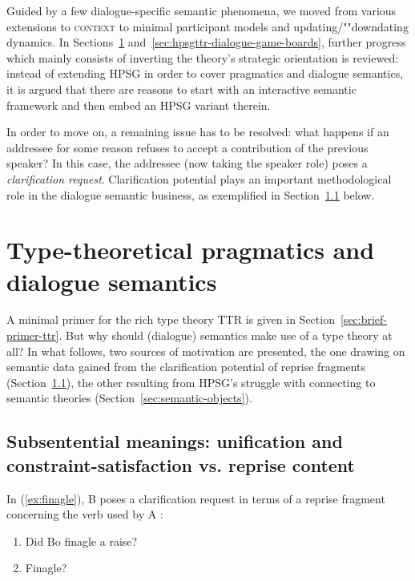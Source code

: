\documentclass[output=paper
	        ,collection
	        ,collectionchapter
 	        ,biblatex
                ,babelshorthands
                ,newtxmath
                ,draftmode
                ,colorlinks, citecolor=brown
]{langscibook}
\begin{document}
Guided by a few dialogue-specific semantic phenomena, we moved from various extensions to \textsc{context}  to minimal participant models and updating/""downdating dynamics.
%
In Sections~\ref{sec:type-theory-pragmatics-semantics} and~\ref{sec:hpsgttr-dialogue-game-boards}, further progress which mainly consists of inverting the theory's strategic orientation is reviewed: instead of extending HPSG in order to cover pragmatics and dialogue semantics, it is argued that there are reasons to start with an interactive semantic framework and then embed an HPSG variant therein.


In order to move on, a remaining issue has to be resolved: what happens if an addressee for some reason refuses to accept a contribution of the previous speaker?
%
In this case, the addressee (now taking the speaker role) poses a \emph{clarification request}. 
%
Clarification potential  plays an important methodological role in the dialogue semantic business, as exemplified in Section~\ref{sec:sub-sentential-meanings} below. 




\section{Type-theoretical pragmatics and dialogue semantics}
\label{sec:type-theory-pragmatics-semantics}

A minimal primer for the rich type theory TTR is given in Section~\ref{sec:brief-primer-ttr}. 
%
But why should (dialogue) semantics make use of a type theory at all?
%
In what follows, two sources of motivation are presented, the one drawing on semantic data gained from the clarification potential of reprise fragments (Section~\ref{sec:sub-sentential-meanings}), the other resulting from HPSG's struggle with connecting to semantic theories (Section~\ref{sec:semantic-objects}).



  
\subsection{Subsentential meanings: unification and constraint-satisfaction vs. reprise content}
\label{sec:sub-sentential-meanings}

In (\ref{ex:finagle}), B poses a clarification request in terms of a reprise fragment concerning the verb used by A \citep[]{Ginzburg:2012}:
%
\ea \label{ex:finagle}
\begin{enumerate}[noitemsep]
\item {} Did Bo finagle a raise?
\item {} Finagle?
\end{enumerate}
\z
\end{document}
